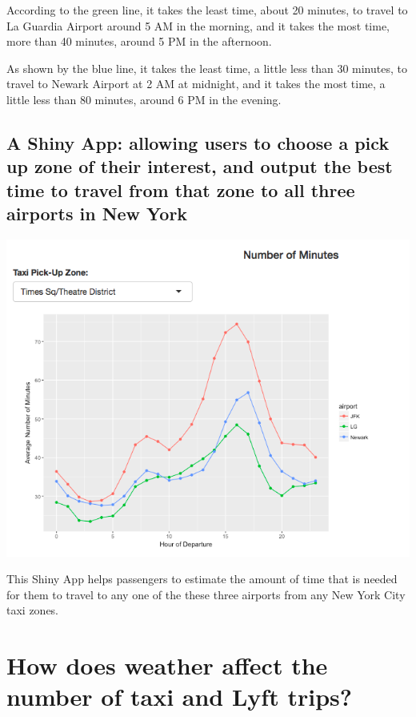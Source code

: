 \documentclass[12pt,twoside]{reedthesis}
\theoremstyle{definition}
\theoremstyle{definition}
\theoremstyle{definition}
\theoremstyle{remark}
\begin{document}
According to the green line, it takes the least time, about 20 minutes,
to travel to La Guardia Airport around 5 AM in the morning, and it takes
the most time, more than 40 minutes, around 5 PM in the afternoon.

As shown by the blue line, it takes the least time, a little less than
30 minutes, to travel to Newark Airport at 2 AM at midnight, and it
takes the most time, a little less than 80 minutes, around 6 PM in the
evening.

\subsection{A Shiny App: allowing users to choose a pick up zone of
their interest, and output the best time to travel from that zone to all
three airports in New
York}\label{a-shiny-app-allowing-users-to-choose-a-pick-up-zone-of-their-interest-and-output-the-best-time-to-travel-from-that-zone-to-all-three-airports-in-new-york}
\begin{center}\includegraphics[width=6.74in]{figure/shinyapp} \end{center}

This Shiny App helps passengers to estimate the amount of time that is
needed for them to travel to any one of the these three airports from
any New York City taxi zones.

\section{How does weather affect the number of taxi and Lyft
trips?}\label{how-does-weather-affect-the-number-of-taxi-and-lyft-trips}
\end{document}
